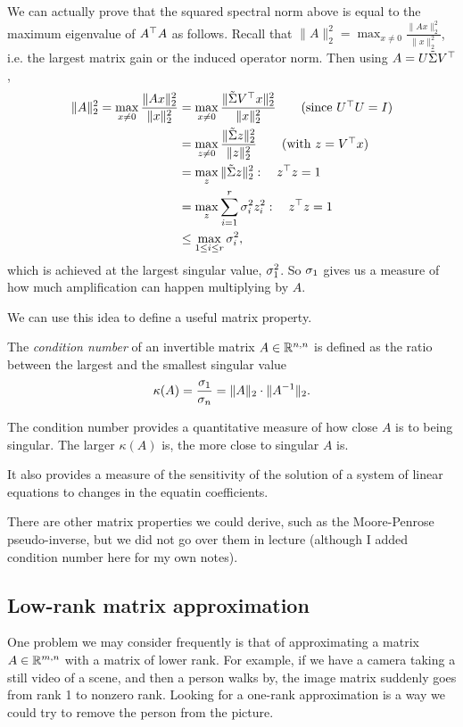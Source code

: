 \documentclass[11 pt]{scrartcl}
\begin{document}
We can actually prove that the squared spectral norm above is equal to the maximum eigenvalue of $A^\top A$ as follows. 
Recall that $\|A\|_2^2 = \max_{x\not= 0} \frac{\|Ax\|_2^2}{\|x\|_2^2}$, i.e. the largest matrix gain or the induced operator norm. 
Then using $A = U\tilde{\Sigma} V^\top$,
\begin{align*}
    \|A\|_2^2 = \max_{x\not= 0} \dfrac{\|Ax\|_2^2}{\|x\|_2^2} &= \max_{x\not= 0} \dfrac{\|\tsig V^\T x \|_2^2}{\|x\|_2^2} \tag{since $U^\T U = I$} \\ 
                                                              &= \max_{z\not= 0} \dfrac{\|\tsig z\|_2^2}{\|z\|_2^2} \tag{with $z = V^\T x$} \\ 
                                                              &= \max_z \|\tsig z \|_2^2 : \quad z^\T z = 1 \\ 
                                                              &= \max_z \sum_{i=1}^r \si_i^2 z_i^2 : \quad z^\T z = 1 \\ 
                                                              &\leq \max_{1\leq i \leq r} \si_i^2,
\end{align*}
which is achieved at the largest singular value, $\sigma_1^2$. 
So $\sigma_1$ gives us a measure of how much amplification can happen multiplying by $A$.

We can use this idea to define a useful matrix property.
\begin{definition}
    The \emph{condition number} of an invertible matrix $A\in \mathbb R^{n,n}$ is defined as the ratio between the largest and the smallest singular value 
    \[ \kappa(A) = \frac{\sigma_1}{\sigma_n} = \|A\|_2\cdot\|A^{-1}\|_2.\] 
\end{definition}

The condition number provides a quantitative measure of how close $A$ is to being singular. 
The larger $\kappa(A)$ is, the more close to singular $A$ is. 

It also provides a measure of the sensitivity of the solution of a system of linear equations to changes in the equatin coefficients.

There are other matrix properties we could derive, such as the Moore-Penrose pseudo-inverse, but we did not go over them in lecture (although I added condition number here for my own notes).

\subsection{Low-rank matrix approximation}
One problem we may consider frequently is that of approximating a matrix $A\in \mathbb R^{m,n}$ with a matrix of lower rank. 
For example, if we have a camera taking a still video of a scene, and then a person walks by, the image matrix suddenly goes from rank 1 to nonzero rank. 
Looking for a one-rank approximation is a way we could try to remove the person from the picture. 
\end{document}
